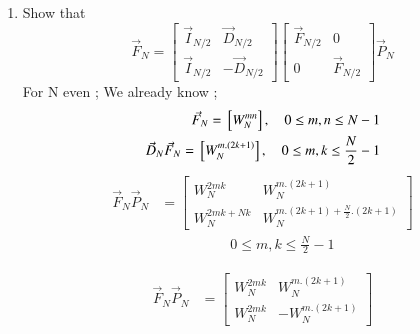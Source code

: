 \documentclass[journal,12pt,twocolumn]{IEEEtran}
\renewcommand\thesection{\arabic{section}}
\begin{document}
\begin{enumerate}[label=\thesection.\arabic*]
\begin{enumerate}[label=\arabic*.,ref=\thesection.\theenumi]
     \item Show that 
     \begin{equation}
       \vec{F}_{N}=
       \begin{bmatrix}
         \vec{I}_{N/2} & \vec{D}_{N/2} \\
         \vec{I}_{N/2} & -\vec{D}_{N/2}
       \end{bmatrix}
       \begin{bmatrix}
         \vec{F}_{N/2} & 0 \\
         0 & \vec{F}_{N/2}
       \end{bmatrix}
       \vec{P}_{N}
     \end{equation}
   \solution
   For N even ;
   We already know ;
   \begin{align}
     \vec{F}_{N} = {}\left[W_{N}^{mn}\right], \quad 0 \le m,n \le N-1  	\\
     \vec{D}_{N}\vec{F}_{N} = {}\left[W_{N}^{m.(2k+1)}\right], \quad 0 \le m,k \le \frac{N}{2}-1  	
   \end{align}
   \begin{align}
     \vec{F}_{N}\vec{P}_{N}&=\begin{bmatrix}
       {W_{N}^{2mk}}&{W_{N}^{m.(2k+1)}}\\ {W_{N}^{2mk+Nk}}&{W_{N}^{m.(2k+1)+\frac{N}{2}.(2k+1)}}
     \end{bmatrix}  \nonumber \\
      &\quad \quad \quad \quad \quad 0 \le m,k \le \frac{N}{2}-1  \nonumber 	
   \end{align}
   
   \begin{align}
     \vec{F}_{N}\vec{P}_{N}&=\begin{bmatrix}
       {W_{N}^{2mk}}&{W_{N}^{m.(2k+1)}}\\ {W_{N}^{2mk}}&-{W_{N}^{m.(2k+1)}}
     \end{bmatrix}  	
   \end{align}
    

\end{enumerate}
\end{enumerate}
\end{document}
